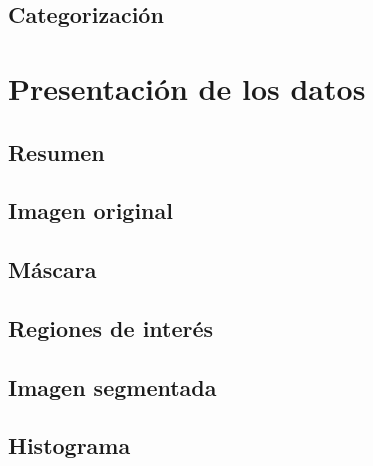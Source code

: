\subsection{Categorización}

\section{Presentación de los datos}

\subsection{Resumen}

\subsection{Imagen original}

\subsection{Máscara}

\subsection{Regiones de interés}

\subsection{Imagen segmentada}

\subsection{Histograma}
\cite{LindermanDgz}